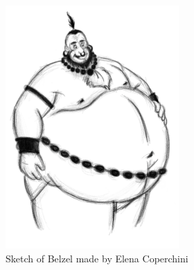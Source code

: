\hfill\begin{minipage}{0.4\textwidth}
  \begin{figure}[H]
    \hfill\includegraphics{Images/Characters/belzel}
    \caption{Sketch of Belzel made by Elena Coperchini}
  \end{figure}
\end{minipage}




